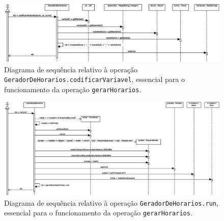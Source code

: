 \documentclass[12pt, a4paper]{article}
\begin{document}
\begin{landscape}
        \vspace*{\fill}
        \pagebreak
        \vspace*{\fill}

        \begin{figure}[H]
            \centering
            \includegraphics[scale=0.80]{Imagens/Modelos/gerarHorariosCodificarVariavel.svg.eps}
            \caption{
                Diagrama de sequência relativo à operação \texttt{GeradorDeHorarios.codificarVariavel},
                essencial para o funcionamento da operação \texttt{gerarHorarios}.
            }
        \end{figure}

        \vspace*{\fill}
        \pagebreak
        \vspace*{\fill}

        \begin{figure}[H]
            \centering
            \includegraphics[scale=0.70]{Imagens/Modelos/gerarHorariosRun.svg.eps}
            \caption{
                Diagrama de sequência relativo à operação \texttt{GeradorDeHorarios.run},
                essencial para o funcionamento da operação \texttt{gerarHorarios}.
            }
        \end{figure}

        \vspace*{\fill}
    \end{landscape}
\endgroup
\end{document}
